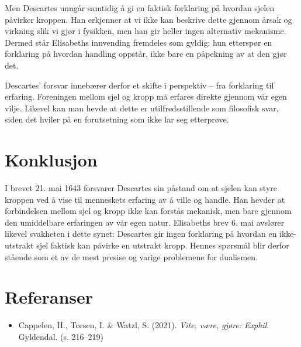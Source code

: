 \documentclass[12pt, a4paper]{article}
\begin{document}
Men Descartes unngår samtidig å gi en faktisk forklaring på hvordan sjelen påvirker kroppen. Han erkjenner at vi ikke kan beskrive dette gjennom årsak og virkning slik vi gjør i fysikken, men han gir heller ingen alternativ mekanisme. Dermed står Elisabeths innvending fremdeles som gyldig: hun etterspør en forklaring på hvordan handling oppstår, ikke bare en påpekning av at den gjør det.

Descartes’ forsvar innebærer derfor et skifte i perspektiv – fra forklaring til erfaring. Foreningen mellom sjel og kropp må erfares direkte gjennom vår egen vilje. Likevel kan man hevde at dette er utilfredsstillende som filosofisk svar, siden det hviler på en forutsetning som ikke lar seg etterprøve.

\section{Konklusjon}

I brevet 21. mai 1643 forsvarer Descartes sin påstand om at sjelen kan styre kroppen ved å vise til menneskets erfaring av å ville og handle. Han hevder at forbindelsen mellom sjel og kropp ikke kan forstås mekanisk, men bare gjennom den umiddelbare erfaringen av vår egen natur. Elisabeths brev 6. mai avslører likevel svakheten i dette synet: Descartes gir ingen forklaring på hvordan en ikke-utstrakt sjel faktisk kan påvirke en utstrakt kropp. Hennes spørsmål blir derfor stående som et av de mest presise og varige problemene for dualismen.

\section{Referanser}

\begin{itemize}
    \item Cappelen, H., Torsen, I. \& Watzl, S. (2021). \textit{Vite, være, gjøre: Exphil}. Gyldendal. (s. 216–219)
\end{itemize}
\end{document}
